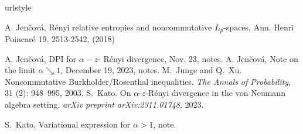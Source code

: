 \documentclass[12pt]{article}
\theoremstyle{definition}
\theoremstyle{remark}
\begin{document}
\begin{thebibliography}{5}
\providecommand{\natexlab}[1]{#1}
\providecommand{\url}[1]{\texttt{#1}}
\expandafter\ifx\csname urlstyle\endcsname\relax
  \providecommand{\doi}[1]{doi: #1}\else
  \providecommand{\doi}{doi: \begingroup \urlstyle{rm}\Url}\fi

 A. Jen\v cov\'a, Rényi relative entropies and noncommutative
$L_p$-spaces, Ann. Henri Poincaré 19, 2513-2542, (2018)

 A. Jen\v cov\'a, DPI for $\alpha-z$- R\'enyi divergence, Nov. 23, notes.
 A. Jen\v cov\'a, Note on the limit $\alpha\searrow 1$, December 19,
2023, notes.
M.~Junge and Q.~Xu.
\newblock Noncommutative {B}urkholder/{R}osenthal inequalities.
\newblock \emph{The Annals of Probability}, 31 (2): 948--995,
  2003.
S.~Kato.
\newblock On $\alpha $-$ z $-{R}\'enyi divergence in the von
  {N}eumann algebra setting.
\newblock \emph{arXiv preprint arXiv:2311.01748}, 2023.

 S.~Kato, Variational expression for $\alpha>1$, note.


\end{thebibliography}
\end{document}
